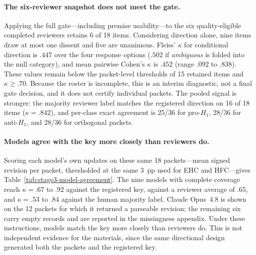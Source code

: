 \paragraph{The six-reviewer snapshot does not meet the gate.} Applying the full
gate---including premise usability---to the six quality-eligible completed
reviewers retains 6 of 18 items. Considering direction alone, nine items draw at
most one dissent and five are unanimous. Fleiss' $\kappa$ for conditional direction is $.447$ over the four
response options ($.502$ if \emph{ambiguous} is folded into the null category), and
mean pairwise Cohen's $\kappa$ is $.452$ (range $.092$ to $.838$). These values
remain below the packet-level thresholds of 15 retained items and
$\kappa\geq.70$. Because the roster is incomplete, this is an interim diagnostic,
not a final gate decision, and it does not certify individual packets. The pooled
signal is stronger: the majority reviewer label matches the registered direction
on 16 of 18 items ($\kappa=.842$), and per-class exact agreement is 25/36 for
pro-$H_1$, 28/36 for anti-$H_1$, and 28/36 for orthogonal packets.

\paragraph{Models agree with the key more closely than reviewers do.} Scoring each
model's own updates on these same 18 packets---mean signed revision per packet,
thresholded at the same 3~pp used for EHC and HFC---gives
Table~\ref{tab:stage3-model-agreement}. The nine models with complete coverage
reach $\kappa=.67$ to $.92$ against the registered key, against a reviewer average of
$.65$, and $\kappa=.53$ to $.84$ against the human majority label. Claude Opus~4.8
is shown on the 12 packets for which it returned a parseable revision; the remaining
six carry empty records and are reported in the missingness appendix. Under these instructions, models match the key more closely than reviewers do.
This is not independent evidence for the materials, since the same directional
design generated both the packets and the registered key.

